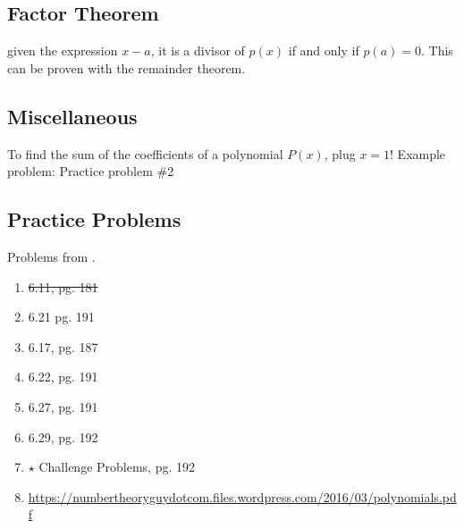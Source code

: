 \subsection{Factor Theorem}
\begin{theorem}
given the expression $x-a$, it is a divisor of $p(x)$ if and only if $p(a)=0$. This can be proven with the remainder theorem.
\end{theorem}

\subsection{Miscellaneous}
To find the sum of the coefficients of a polynomial $P(x)$, plug $x=1$! 
Example problem: Practice problem \#2
 
\subsection{Practice Problems}
Problems from \ia.
\begin{enumerate}
  \item \sout{6.11, pg. 181}
  \item 6.21 pg. 191
  \item 6.17, pg. 187
  \item 6.22, pg. 191
  \item 6.27, pg. 191
  \item 6.29, pg. 192
  \item $\star$ Challenge Problems, pg. 192
  \item \url{https://numbertheoryguydotcom.files.wordpress.com/2016/03/polynomials.pdf}
\end{enumerate}